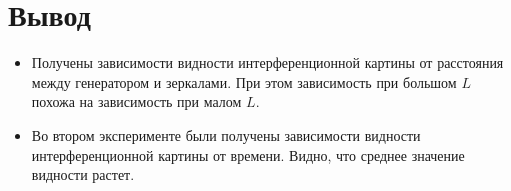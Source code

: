 \documentclass{article}
\begin{document}
\section{Вывод}

\begin{itemize}
	\item Получены зависимости видности интерференционной картины от расстояния между генератором и зеркалами.
	      При этом зависимость при большом $L$ похожа на зависимость при малом $L$.
	\item Во втором эксперименте были получены зависимости видности интерференционной
	      картины от времени. Видно, что среднее значение видности растет.

\end{itemize}
\end{document}
